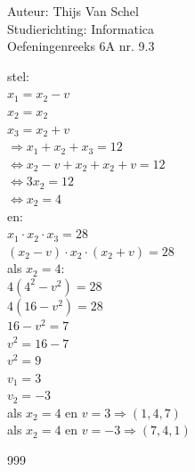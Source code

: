 \documentclass[a4paper]{article}
\begin{document}
  
\noindent \large Auteur: Thijs Van Schel \\
\noindent \large Studierichting: Informatica\\
\noindent \large Oefeningenreeks 6A nr. 9.3\\

\medskip

\normalsize

stel:\\

$x_1=x_2-v$\\

$x_2=x_2$\\

$x_3=x_2+v$\\

$\Rightarrow x_1+x_2+x_3=12$\\

$\Leftrightarrow x_2-v+x_2+x_2+v=12$\\

$\Leftrightarrow 3x_2=12$\\

$\Leftrightarrow x_2=4$\\

en:\\

$x_1 \cdot x_2 \cdot x_3=28$\\

$(x_2-v) \cdot x_2 \cdot (x_2+v) = 28$\\

als $x_2=4$:\\

$4(4^2 - v^2) = 28$\\

$4(16 - v^2) = 28$\\

$16 - v^2 = 7$\\

$v^2 = 16 - 7$\\

$v^2=9$\\

$v_1=3$\\

$v_2=-3$\\

als $x_2=4$ en $v=3\Rightarrow (1, 4, 7)$\\

als $x_2=4$ en $v=-3 \Rightarrow (7, 4, 1)$\\

\begin{thebibliography}{999}
\end{thebibliography}
\end{document}
